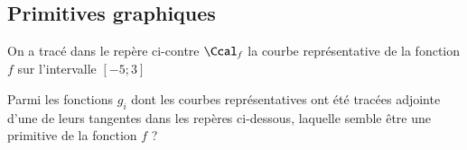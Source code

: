 \documentclass[oneside,12pt]{article}          %
\begin{document}
\subsection{Primitives graphiques}
\begin{minipage}{0.6\linewidth}\restoreskip
    On a tracé dans le repère ci-contre $\Ccal_f$ la courbe représentative de la fonction $f$ sur l'intervalle $[-5;3]$

    Parmi les fonctions $g_i$ dont les courbes représentatives ont été tracées adjointe d'une de leurs tangentes dans les repères ci-dessous, laquelle semble être une primitive de la fonction $f$ ?
\end{minipage}\hspace{3mm}
\begin{minipage}{0.45\linewidth}
\end{minipage}
\end{document}
